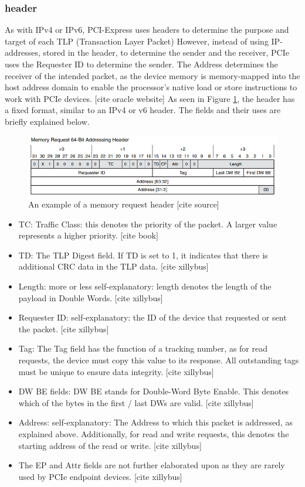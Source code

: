 \subsubsection{header}
As with IPv4 or IPv6, PCI-Express uses headers to determine the purpose and target of each TLP (Transaction Layer Packet)
However, instead of using IP-addresses, stored in the header, to determine the sender and the receiver, PCIe uses the Requester ID to determine the sender. The Address determines the receiver of the intended packet, as the device memory is memory-mapped into the host address domain to enable the processor's native load or store instructions to work with PCIe devices. [cite oracle website] As seen in Figure \ref{fig:header}, the header has a fixed format, similar to an IPv4 or v6 header. The fields and their uses are briefly explained below.

\begin{figure}
\includegraphics[width = \linewidth]{figures/PCIE-header}
\caption{An example of a memory request header [cite source]}
\label{fig:header}
\end{figure}


\begin{itemize}
\item TC: Traffic Class: this denotes the priority of the packet. A larger value represents a higher priority. [cite book]
\item TD: The TLP Digest field. If TD is set to 1, it indicates that there is additional CRC data in the TLP data. [cite xillybus]
\item Length: more or less self-explanatory: length denotes the length of the payload in Double Words. [cite xillybus]
\item Requester ID: self-explanatory: the ID of the device that requested or sent the packet. [cite xillybus]
\item Tag: The Tag field has the function of a tracking number, as for read requests, the device must copy this value to its response. All outstanding tags must be unique to ensure data integrity. [cite xillybus]
\item DW BE fields: DW BE stands for Double-Word Byte Enable. This denotes which of the bytes in the first / last DWs are valid. [cite xillybus]
\item Address: self-explanatory: The Address to which this packet is addressed, as explained above. Additionally, for read and write requests, this denotes the starting address of the read or write. [cite xillybus]
\item The EP and Attr fields are not further elaborated upon as they are rarely used by PCIe endpoint devices. [cite xillybus]
\end{itemize}



